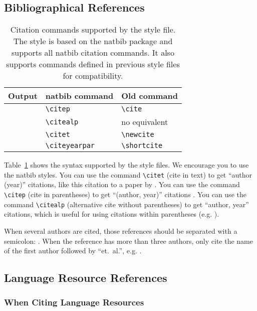 \documentclass[10pt, a4paper]{article}
\begin{document}
\subsection{Bibliographical References}


\begin{table}
\centering
\begin{tabular}{lll}
\hline
\textbf{Output} & \textbf{natbib command} & \textbf{Old command}\\
\hline
\citep{Eco:1990} & \verb|\citep| & \verb|\cite| \\
\citealp{Eco:1990} & \verb|\citealp| & no equivalent \\
\citet{Eco:1990} & \verb|\citet| & \verb|\newcite| \\
\citeyearpar{Eco:1990} & \verb|\citeyearpar| & \verb|\shortcite| \\
\hline
\end{tabular}
\caption{\label{citation-guide} Citation commands supported by the style file. The style is based on the natbib package and supports all natbib citation commands. It also supports commands defined in previous style files for compatibility.}
\end{table}

Table~\ref{citation-guide} shows the syntax supported by the style files. We encourage you to use the natbib styles.
You can use the command \verb|\citet| (cite in text) to get ``author (year)'' citations, like this citation to a paper by \citet{CastorPollux-92}. You can use the command \verb|\citep| (cite in parentheses) to get ``(author, year)'' citations \citep{CastorPollux-92}. You can use the command \verb|\citealp| (alternative cite without parentheses) to get ``author, year'' citations, which is useful for using citations within parentheses (e.g. \citealp{CastorPollux-92}).

When several authors are cited, those references should be separated with a semicolon: \cite{Martin-90,CastorPollux-92}. When the reference has more than three authors, only cite the name of the first author followed by ``et.\ al.'', e.g. \citet{Superman-Batman-Catwoman-Spiderman-00}.

\subsection{Language Resource References}

\subsubsection{When Citing Language Resources}
\end{document}
